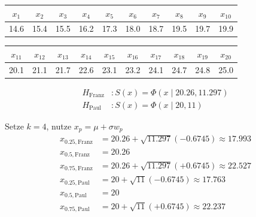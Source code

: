 \documentclass{beamer}
\begin{document}
\begin{frame}{\insertsection}
\begin{example}[Beobachtungen]
	\begin{table}[htb]
	\center
	\begin{tabular}{cccccccccc}
	$x_1$	&$x_2$	&$x_3$	&$x_4$	&$x_5$	&$x_6$	&$x_7$	&$x_8$	&$x_9$	&$x_{10}$\\
	\hline
	14.6	&15.4	&15.5	&16.2	&17.3	&18.0	&18.7	&19.5	&19.7	&19.9	\\
	\end{tabular}
	\begin{tabular}{cccccccccc}
	$x_{11}$	&$x_{12}$	&$x_{13}$	&$x_{14}$	&$x_{15}$	&$x_{16}$	&$x_{17}$	&$x_{18}$	&$x_{19}$	&$x_{20}$\\
	\hline
	20.1	&21.1	&21.7	&22.6	&23.1	&23.2	&24.1	&24.7	&24.8	&25.0	\\
	\end{tabular}
	\end{table}
\end{example}
\begin{example}[Hypothesen]
	\begin{align*}
		H_{\text{Franz}} &: S(x) = \Phi(x\mid 20.26, 11.297)
		\\
		H_{\text{Paul}} &: S(x) = \Phi(x\mid 20, 11)
	\end{align*}
\end{example}
\end{frame}

\begin{frame}{\insertsection}
\begin{example}
	Setze $k=4$, nutze $ x_p = \mu + \sigma w_p $
	\begin{align*}
		x_{0.25, \text{Franz}} &= 20.26 + \sqrt{11.297}(-0.6745) \approx 17.993 \\
		x_{0.5, \text{Franz}} &= 20.26 \\
		x_{0.75, \text{Franz}} &= 20.26 + \sqrt{11.297}(+0.6745) \approx 22.527
		\\[1ex]
		x_{0.25, \text{Paul}} &= 20 + \sqrt{11}(-0.6745) \approx 17.763\\
		x_{0.5, \text{Paul}} &= 20 \\
		x_{0.75, \text{Paul}} &= 20 + \sqrt{11}(+0.6745) \approx 22.237
	\end{align*}
\end{example}
\end{frame}
\end{document}
